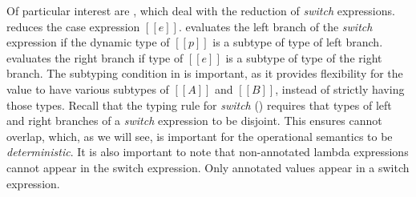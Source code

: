 Of particular interest are
, which deal with the reduction
of \emph{switch} expressions.
 reduces the case expression $[[e]]$.
 evaluates
the left branch of the \emph{switch} expression if the dynamic type of $[[p]]$ is
a subtype of type of left branch.  evaluates the right
branch if type of $[[e]]$ is a subtype
of type of the right branch. The subtyping condition in
 is important, as it provides
flexibility for the value to have various subtypes of $[[A]]$ and $[[B]]$, instead
of strictly having those types. Recall that
the typing rule for \emph{switch} () requires that
types of left and right branches of a \emph{switch}
expression to be disjoint.
This ensures  cannot overlap, which, as we will
see, is important for the
operational semantics to be \textit{deterministic}.
It is also important to note that non-annotated lambda expressions cannot appear
in the switch expression. Only annotated values appear in a switch expression.



\begin{comment}
\paragraph{Dynamic Type} The dynamic semantics employs a simple
function that retrieves the dynamic type of a pre-value.
The definition is shown in the lower part of \Cref{fig:union:os}.
$[[Int]]$ is returned when $[[p]]$ is an integer $[[i]]$.
Otherwise, for functions, the function annotation $[[A -> B]]$ is returned.
\end{comment}



